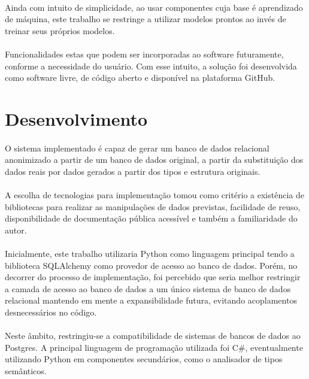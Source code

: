 \paragraph{} Ainda com intuito de simplicidade, ao usar componentes cuja base é aprendizado de máquina, este trabalho se restringe a utilizar modelos prontos ao invés de treinar seus próprios modelos.

\paragraph{} Funcionalidades estas que podem ser incorporadas ao software futuramente, conforme a necessidade do usuário. Com esse intuito, a solução foi desenvolvida como software livre, de código aberto e disponível na plataforma GitHub.

\section{Desenvolvimento}

\paragraph{} O sistema implementado é capaz de gerar um banco de dados relacional anonimizado a partir de um banco de dados original, a partir da substituição dos dados reais por dados gerados a partir dos tipos e estrutura originais.

\paragraph{} A escolha de tecnologias para implementação tomou como critério a existência de bibliotecas para realizar as manipulações de dados previstas, facilidade de reuso, disponibilidade de documentação pública acessível e também a familiaridade do autor.

\paragraph{} Inicialmente, este trabalho utilizaria Python como linguagem principal tendo a biblioteca SQLAlchemy como provedor de acesso ao banco de dados. Porém, no decorrer do processo de implementação, foi percebido que seria melhor restringir a camada de acesso ao banco de dados a um único sistema de banco de dados relacional mantendo em mente a expansibilidade futura, evitando acoplamentos desnecessários no código. 

\paragraph{} Neste âmbito, restringiu-se a compatibilidade de sistemas de bancos de dados ao Postgres. A principal linguagem de programação utilizada foi C$\#$, eventualmente utilizando Python em componentes secundários, como o analisador de tipos semânticos.

